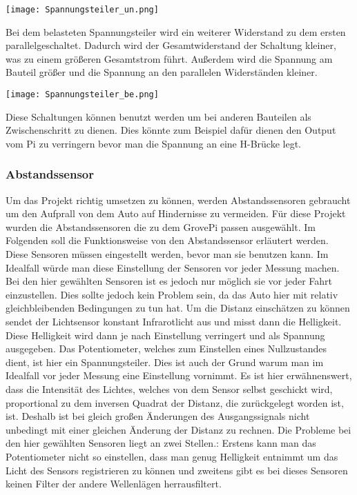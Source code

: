 \documentclass[notitlepage]{report}
\begin{document}
\texttt{[image: Spannungsteiler\_un.png]}

Bei dem belasteten Spannungsteiler wird ein weiterer Widerstand zu dem ersten parallelgeschaltet. Dadurch wird der Gesamtwiderstand der Schaltung kleiner, was zu einem gr\"{o}{\ss}eren Gesamtstrom f\"{u}hrt. Au{\ss}erdem wird die Spannung am Bauteil gr\"{o}{\ss}er und die Spannung an den parallelen Widerst\"{a}nden kleiner. 

\texttt{[image: Spannungsteiler\_be.png]}

Diese Schaltungen k\"{o}nnen benutzt werden um bei anderen Bauteilen als Zwischenschritt zu dienen. Dies k\"{o}nnte zum Beispiel daf\"{u}r dienen den Output vom Pi zu verringern bevor man die Spannung an eine H-Br\"{u}cke legt. 

\subsubsection{Abstandssensor}

Um das Projekt richtig umsetzen zu k\"{o}nnen, werden Abstandssensoren gebraucht um den Aufprall von dem Auto auf Hindernisse zu vermeiden. F\"{u}r diese Projekt wurden die Abstandssensoren die zu dem GrovePi passen ausgew\"{a}hlt. Im Folgenden soll die Funktionsweise von den Abstandssensor erl\"{a}utert werden.
 Diese Sensoren m\"{u}ssen eingestellt werden, bevor man sie benutzen kann. Im Idealfall w\"{u}rde man diese Einstellung der Sensoren vor jeder Messung machen. Bei den hier gew\"{a}hlten Sensoren ist es jedoch nur m\"{o}glich sie vor jeder Fahrt einzustellen. Dies sollte jedoch kein Problem sein, da das Auto hier mit relativ gleichbleibenden Bedingungen zu tun hat.  
Um die Distanz einsch\"{a}tzen zu k\"{o}nnen sendet der Lichtsensor konstant Infrarotlicht aus und misst dann die Helligkeit. Diese Helligkeit wird dann je nach Einstellung verringert und als Spannung ausgegeben. Das Potentiometer, welches zum Einstellen eines Nullzustandes dient, ist hier ein Spannungsteiler. Dies ist auch der Grund warum man im Idealfall vor jeder Messung eine Einstellung vornimmt.
Es ist hier erw\"{a}hnenswert, dass die Intensit\"{a}t des Lichtes, welches von dem Sensor selbst geschickt wird, proportional zu dem inversen Quadrat der Distanz, die zur\"{u}ckgelegt worden ist, ist. Deshalb ist bei gleich gro{\ss}en \"{A}nderungen des Ausgangssignals nicht unbedingt mit einer gleichen \"{A}nderung der Distanz zu rechnen.  
Die Probleme bei den hier gew\"{a}hlten Sensoren liegt an zwei Stellen.: Erstens kann man das Potentiometer nicht so einstellen, dass man genug Helligkeit entnimmt um das Licht des Sensors registrieren zu k\"{o}nnen und zweitens gibt es bei dieses Sensoren keinen Filter der andere Wellenl\"{a}gen herrausfiltert.
\end{document}
